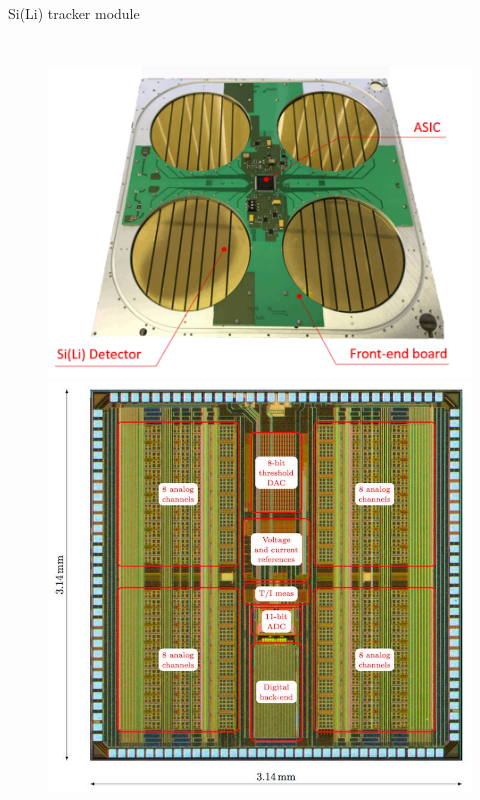 \documentclass[aspectratio=169,xcolor=dvipsnames]{beamer}
\begin{document}
{\begin{frame}{Si(Li) tracker module}
\begin{columns}
        \begin{figure}
        \centering
        \vspace{-0.25cm}
        \includegraphics[height=0.4\textheight]{images/experiment_intro/GAPS_FEB_ASIC_3.png}
        \vspace{0.2cm}
        \vskip0.001cm
        \includegraphics[height=0.35\textheight]{images/experiment_intro/gaps_asic_circuit.jpg}
        \end{figure}
    \end{columns}
\end{frame}
}
\end{document}
